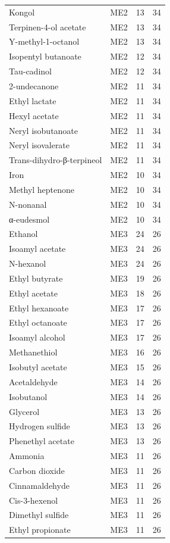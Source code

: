 {\begin{longtable}{lrrr}
Kongol & ME2 & 13 & 34 \\
Terpinen-4-ol acetate & ME2 & 13 & 34 \\
Y-methyl-1-octanol & ME2 & 13 & 34 \\
Isopentyl butanoate & ME2 & 12 & 34 \\
Tau-cadinol & ME2 & 12 & 34 \\
2-undecanone & ME2 & 11 & 34 \\
Ethyl lactate & ME2 & 11 & 34 \\
Hexyl acetate & ME2 & 11 & 34 \\
Neryl isobutanoate & ME2 & 11 & 34 \\
Neryl isovalerate & ME2 & 11 & 34 \\
Trans-dihydro-β-terpineol & ME2 & 11 & 34 \\
Iron & ME2 & 10 & 34 \\
Methyl heptenone & ME2 & 10 & 34 \\
N-nonanal & ME2 & 10 & 34 \\
α-eudesmol & ME2 & 10 & 34 \\
Ethanol & ME3 & 24 & 26 \\
Isoamyl acetate & ME3 & 24 & 26 \\
N-hexanol & ME3 & 24 & 26 \\
Ethyl butyrate & ME3 & 19 & 26 \\
Ethyl acetate & ME3 & 18 & 26 \\
Ethyl hexanoate & ME3 & 17 & 26 \\
Ethyl octanoate & ME3 & 17 & 26 \\
Isoamyl alcohol & ME3 & 17 & 26 \\
Methanethiol & ME3 & 16 & 26 \\
Isobutyl acetate & ME3 & 15 & 26 \\
Acetaldehyde & ME3 & 14 & 26 \\
Isobutanol & ME3 & 14 & 26 \\
Glycerol & ME3 & 13 & 26 \\
Hydrogen sulfide & ME3 & 13 & 26 \\
Phenethyl acetate & ME3 & 13 & 26 \\
Ammonia & ME3 & 11 & 26 \\
Carbon dioxide & ME3 & 11 & 26 \\
Cinnamaldehyde & ME3 & 11 & 26 \\
Cis-3-hexenol & ME3 & 11 & 26 \\
Dimethyl sulfide & ME3 & 11 & 26 \\
Ethyl propionate & ME3 & 11 & 26 \\

\end{longtable}}
